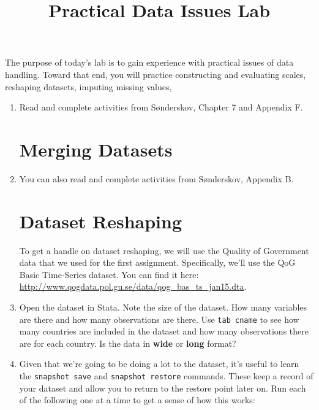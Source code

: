 \documentclass[a4paper,12pt]{article}
\title{Practical Data Issues Lab}
\author{}
\date{}
\begin{document}
	
\maketitle

\vspace{-2em}
	
\noindent The purpose of today's lab is to gain experience with practical issues of data handling. Toward that end, you will practice constructing and evaluating scales, reshaping datasets, imputing missing values, 

\begin{enumerate}\itemsep1em

\section*{Scale Construction}

\item Read and complete activities from S{\o}nderskov, Chapter 7 and Appendix F.

\section*{Merging Datasets}

\item You can also read and complete activities from S{\o}nderskov, Appendix B.

\section*{Dataset Reshaping}

To get a handle on dataset reshaping, we will use the Quality of Government data that we used for the first assignment. Specifically, we'll use the QoG Basic Time-Series dataset. You can find it here: \url{http://www.qogdata.pol.gu.se/data/qog_bas_ts_jan15.dta}.

\item Open the dataset in Stata. Note the size of the dataset. How many variables are there and how many observations are there. Use \texttt{tab cname} to see how many countries are included in the dataset and how many observations there are for each country. Is the data in \textbf{wide} or \textbf{long} format?

\item Given that we're going to be doing a lot to the dataset, it's useful to learn the \texttt{snapshot save} and \texttt{snapshot restore} commands. These keep a record of your dataset and allow you to return to the restore point later on. Run each of the following one at a time to get a sense of how this works:


\end{enumerate}
\end{document}
